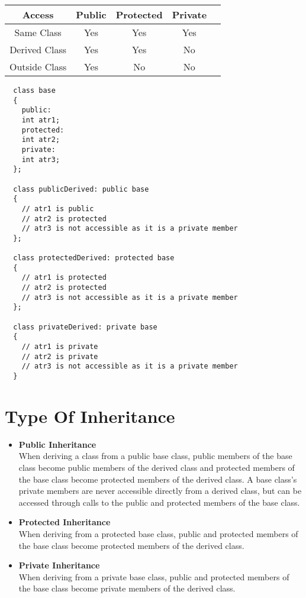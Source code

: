 \documentclass[11pt,fleqn]{book} %
\begin{document}
\begin{center}
  \begin{tabular}{ |c|c|c|c|c| } 
    \hline
    Access & Public & Protected & Private \\
    \hline
    Same Class & Yes & Yes & Yes \\ 
    Derived Class & Yes & Yes & No \\ 
    Outside Class & Yes & No & No \\ 
    \hline
  \end{tabular}
\end{center}
\begin{lstlisting}
  class base 
  {
    public:
    int atr1;
    protected:
    int atr2;
    private:
    int atr3;
  };

  class publicDerived: public base
  {
    // atr1 is public
    // atr2 is protected
    // atr3 is not accessible as it is a private member
  };

  class protectedDerived: protected base
  {
    // atr1 is protected
    // atr2 is protected
    // atr3 is not accessible as it is a private member
  };

  class privateDerived: private base
  {
    // atr1 is private
    // atr2 is private
    // atr3 is not accessible as it is a private member 
  }
\end{lstlisting}

\section{Type Of Inheritance}
\begin{itemize}
\item \textbf{Public Inheritance} \\
  When deriving a class from a public base class, public members of the base class become public members of the derived class and protected members of the base class become protected members of the derived class. A base class's private members are never accessible directly from a derived class, but can be accessed through calls to the public and protected members of the base class.\\
\item \textbf{Protected Inheritance} \\
  When deriving from a protected base class, public and protected members of the base class become protected members of the derived class.\\
\item \textbf{Private Inheritance} \\
  When deriving from a private base class, public and protected members of the base class become private members of the derived class. 
\end{itemize}
\newpage
\end{document}
